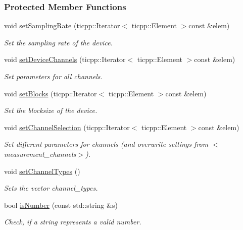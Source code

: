 \subsubsection*{Protected Member Functions}
\begin{DoxyCompactItemize}
\item 
void \hyperlink{class_h_w_thread_a1bd5e440e5f86d0d9af928577c52b262}{setSamplingRate} (ticpp::Iterator$<$ ticpp::Element $>$const \&elem)
\begin{DoxyCompactList}\small\item\em Set the sampling rate of the device. \item\end{DoxyCompactList}\item 
void \hyperlink{class_h_w_thread_a379eecae202ad9b740e08ac22b5d7a42}{setDeviceChannels} (ticpp::Iterator$<$ ticpp::Element $>$const \&elem)
\begin{DoxyCompactList}\small\item\em Set parameters for all channels. \item\end{DoxyCompactList}\item 
void \hyperlink{class_h_w_thread_a8c3dada5e55e8e29eadf41e2097ec80a}{setBlocks} (ticpp::Iterator$<$ ticpp::Element $>$const \&elem)
\begin{DoxyCompactList}\small\item\em Set the blocksize of the device. \item\end{DoxyCompactList}\item 
void \hyperlink{class_h_w_thread_a6ed2a51d2a3a7b9313d1c33f5f507c57}{setChannelSelection} (ticpp::Iterator$<$ ticpp::Element $>$const \&elem)
\begin{DoxyCompactList}\small\item\em Set different parameters for channels (and overwrite settings from $<$measurement\_\-channels$>$). \item\end{DoxyCompactList}\item 
\hypertarget{class_h_w_thread_af0a839e6a139fa0a261a589a6df07de3}{
void \hyperlink{class_h_w_thread_af0a839e6a139fa0a261a589a6df07de3}{setChannelTypes} ()}
\label{class_h_w_thread_af0a839e6a139fa0a261a589a6df07de3}

\begin{DoxyCompactList}\small\item\em Sets the vector channel\_\-types. \item\end{DoxyCompactList}\item 
bool \hyperlink{class_h_w_thread_afc7da1ef263177f3108dcc318208dc60}{isNumber} (const std::string \&s)
\begin{DoxyCompactList}\small\item\em Check, if a string represents a valid number. \item\end{DoxyCompactList}\end{DoxyCompactItemize}
